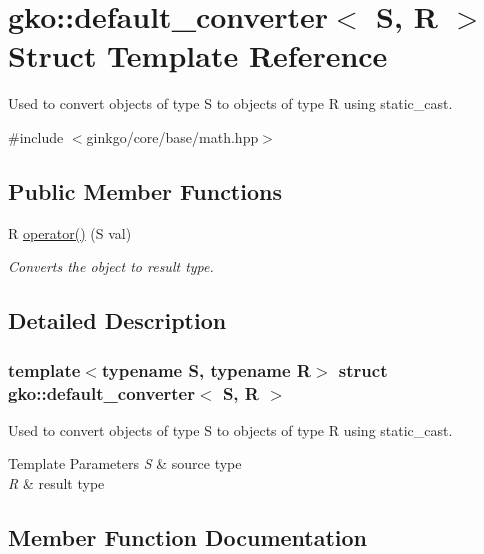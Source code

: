 \hypertarget{structgko_1_1default__converter}{}\section{gko\+:\+:default\+\_\+converter$<$ S, R $>$ Struct Template Reference}
\label{structgko_1_1default__converter}


Used to convert objects of type {\ttfamily S} to objects of type {\ttfamily R} using static\+\_\+cast.  




{\ttfamily \#include $<$ginkgo/core/base/math.\+hpp$>$}

\subsection*{Public Member Functions}
\begin{DoxyCompactItemize}
\item 
R \hyperlink{structgko_1_1default__converter_aeeb535f41abb975f20857989c8ac2470}{operator()} (S val)
\begin{DoxyCompactList}\small\item\em Converts the object to result type. \end{DoxyCompactList}\end{DoxyCompactItemize}


\subsection{Detailed Description}
\subsubsection*{template$<$typename S, typename R$>$\newline
struct gko\+::default\+\_\+converter$<$ S, R $>$}

Used to convert objects of type {\ttfamily S} to objects of type {\ttfamily R} using static\+\_\+cast. 


\begin{DoxyTemplParams}{Template Parameters}
{\em S} & source type \\
\hline
{\em R} & result type \\
\hline
\end{DoxyTemplParams}


\subsection{Member Function Documentation}
\mbox{\label{structgko_1_1default__converter_aeeb535f41abb975f20857989c8ac2470}} 
